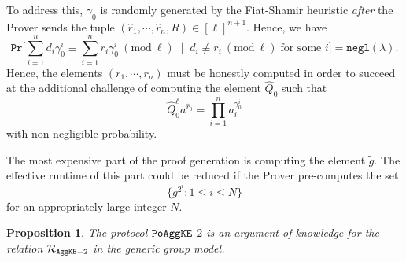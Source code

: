 \documentclass[11pt, lettersize, notitlepage, leqno, footskip=0.6cm]{article}
\newcommand{\pl}{\prod\limits}
\newcommand{\slim}{\sum\limits}
\newcommand{\ttt}{\texttt}
\newcommand{\negl}{\ttt{{negl}}}
\newcommand{\wti}{\widetilde}
\newcommand{\mc}{\mathcal}
\newcommand{\lam}{\lambda}
\newcommand{\what}{\widehat}
\newcommand{\Prob}{\ttt{Pr}}
\newcommand{\vs}{\vspace{-0.15cm}}
\newcommand{\Mod}[1]{\ (\mathrm{mod}\ #1)}
\newtheorem{Prop}[Thm]{Proposition}
\numberwithin{equation}{section}
\begin{document}
To address this, $\gamma_{0}$ is randomly generated by the Fiat-Shamir heuristic \textit{after} the Prover sends the tuple $(\what{r}_1,\cdots,\what{r}_n, R)\in[\ell]^{n+1}$. Hence, we have \vs $$\Prob\Big[\slim_{i=1}^n d_i\gamma_{0}^i \equiv \slim_{i=1}^n r_i\gamma_{0}^i \Mod{\ell}\;\;\Big|\;\; d_i\not\equiv r_i\Mod{\ell}\;\text{for some } i\Big] = \negl(\lam). $$ Hence, the elements $(r_1,\cdots,r_n)$ must be honestly computed in order to succeed at the additional challenge of computing the element $\what{Q}_0$ such that \vs $$\what{Q}_0^{\ell}a^{\what{r}_0}= \pl_{i=1}^{n} a_i^{\gamma_{0}^i} $$ with non-negligible probability.

The most expensive part of the proof generation is computing the element $\wti{g}$. The effective runtime of this part could be reduced if the Prover pre-computes the set \vs $$\{g^{2^i}: 1\leq i\leq N \} $$ for an appropriately large integer $N$.

\vspace{0.2cm}

\begin{Prop} \hyperlink{AggKE-2}{The protocol $\tt{PoAggKE}$-$2$} is an argument of knowledge for the relation $\mc{R}_{{\tt{AggKE-2}}}$ in the generic group model.\end{Prop}
\end{document}
